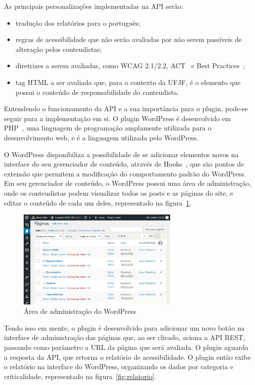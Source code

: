 \documentclass[
    12pt,
    a4paper,
    oneside,
    brazil,
    english
]{article}
\begin{document}
As principais personalizações implementadas na API serão:
\begin{itemize}
    \item tradução dos relatórios para o português;
    \item regras de acessibilidade que
          não serão avaliadas por não serem passíveis de alteração pelos conteudistas;
    \item diretrizes a serem avaliadas, como WCAG 2.1/2.2, ACT~\cite{ACT} e Best
          Practices~\cite{BP};
    \item tag HTML a ser avaliada que, para o contexto da UFJF, é o elemento que possui o conteúdo de responsabilidade do conteudista.
\end{itemize}

Entendendo o funcionamento da API e a sua importância para o
plugin, pode-se seguir para a implementação em si. O plugin WordPress
é desenvolvido em PHP~\cite{php}, uma linguagem de programação amplamente utilizada
para o desenvolvimento web, e é a linguagem utilizada pelo WordPress.

O WordPress disponibiliza a possibilidade de se adicionar elementos novos na interface
do seu gerenciador de conteúdo, através de Hooks~\cite{hooks}, que são pontos
de extensão que permitem a modificação do comportamento padrão do WordPress. Em seu
gerenciador de conteúdo, o WordPress possui uma área de administração, onde
os conteudistas podem visualizar todos os posts e as páginas do site, e editar o conteúdo
de cada um deles, representado na figura~\ref{fig:wp-admin}.
\begin{figure}[ht]
    \centering
    \caption{Área de administração do WordPress}
    \label{fig:wp-admin}
    \includegraphics[width=0.7\textwidth]{imagem1.png}
\end{figure}

Tendo isso em mente, o plugin é desenvolvido para adicionar um novo botão na
interface de administração das páginas que, ao ser clicado, aciona a API REST,
passando como parâmetro a URL da página que será avaliada. O plugin aguarda a resposta da API,
que retorna o relatório de acessibilidade. O plugin
então exibe o relatório na interface do WordPress, organizando os dados
por categoria e criticalidade, representado na figura~\ref{fig:relatorio}.
\end{document}

